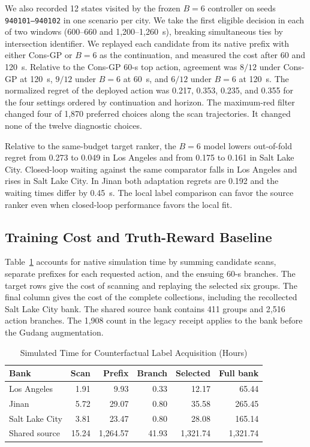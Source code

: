 \documentclass[letterpaper,journal]{IEEEtran}
\begin{document}
We also recorded 12 states visited by the frozen $B=6$ controller on seeds \texttt{940101--940102} in one scenario per city. We take the first eligible decision in each of two windows (600--660 and 1,200--1,260~s), breaking simultaneous ties by intersection identifier. We replayed each candidate from its native prefix with either Cons-GP or $B=6$ as the continuation, and measured the cost after 60 and 120~s. Relative to the Cons-GP 60-s top action, agreement was $8/12$ under Cons-GP at 120~s, $9/12$ under $B=6$ at 60~s, and $6/12$ under $B=6$ at 120~s. The normalized regret of the deployed action was 0.217, 0.353, 0.235, and 0.355 for the four settings ordered by continuation and horizon. The maximum-red filter changed four of 1,870 preferred choices along the scan trajectories. It changed none of the twelve diagnostic choices.

Relative to the same-budget target ranker, the $B=6$ model lowers out-of-fold regret from 0.273 to 0.049 in Los Angeles and from 0.175 to 0.161 in Salt Lake City. Closed-loop waiting against the same comparator falls in Los Angeles and rises in Salt Lake City. In Jinan both adaptation regrets are 0.192 and the waiting times differ by 0.45~s. The local label comparison can favor the source ranker even when closed-loop performance favors the local fit.

\subsection{Training Cost and Truth-Reward Baseline}
\label{sec:training_cost}
Table~\ref{tab:acquisition_cost} accounts for native simulation time by summing candidate scans, separate prefixes for each requested action, and the ensuing 60-s branches. The target rows give the cost of scanning and replaying the selected six groups. The final column gives the cost of the complete collections, including the recollected Salt Lake City bank. The shared source bank contains 411 groups and 2,516 action branches. The 1,908 count in the legacy receipt applies to the bank before the Gudang augmentation.

\begin{table}[!t]
\centering
\caption{Simulated Time for Counterfactual Label Acquisition (Hours)}
\label{tab:acquisition_cost}
\footnotesize
\setlength{\tabcolsep}{3.3pt}
\begin{tabular}{@{}lrrrrr@{}}
\toprule
Bank & Scan & Prefix & Branch & Selected & Full bank\\
\midrule
Los Angeles & 1.91 & 9.93 & 0.33 & 12.17 & 65.44\\
Jinan & 5.72 & 29.07 & 0.80 & 35.58 & 265.45\\
Salt Lake City & 3.81 & 23.47 & 0.80 & 28.08 & 165.14\\
Shared source & 15.24 & 1,264.57 & 41.93 & 1,321.74 & 1,321.74\\
\bottomrule
\end{tabular}
\end{table}
\end{document}
